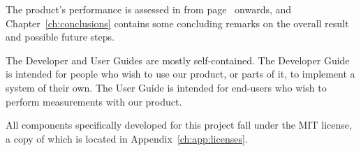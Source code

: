 The  product's  performance  is assessed  in  \emph{}
from page~\pageref{ch:verification}  onwards, and Chapter~\ref{ch:conclusions}
contains some  concluding remarks  on the overall  result and  possible future
steps.

The Developer and  User Guides are mostly  self-contained. The Developer Guide
is  intended for  people who  wish to  use  our product,  or parts  of it,  to
implement a system of their own. The  User Guide is intended for end-users who
wish to perform measurements with our product.

\enlargethispage{4ex}
\vspace{1ex}
\noindent All  components specifically developed  for this project  fall under
the MIT license, a copy of which is located in Appendix~\ref{ch:app:licenses}.

